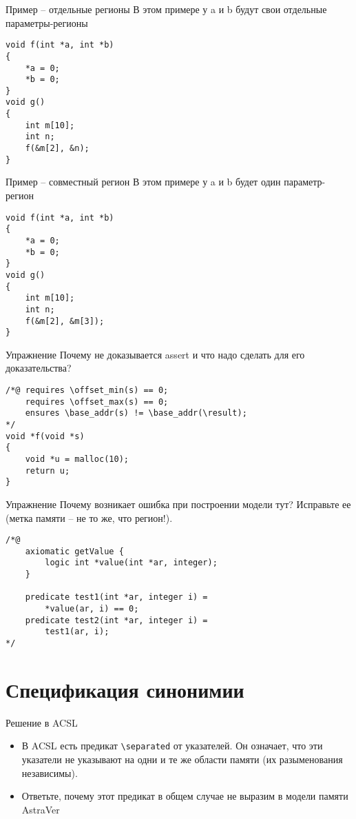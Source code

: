 \documentclass[hyperref={unicode=true}]{beamer}
\begin{document}
    \begin{frame}[fragile]{Пример -- отдельные регионы}
    В этом примере у a и b будут свои отдельные параметры-регионы
    \begin{lstlisting}
void f(int *a, int *b)
{
    *a = 0;
    *b = 0;
}
void g()
{
    int m[10];
    int n;
    f(&m[2], &n);
}    \end{lstlisting}
    \end{frame}

    \begin{frame}[fragile]{Пример -- совместный регион}
    В этом примере у a и b будет один параметр-регион
    \begin{lstlisting}
void f(int *a, int *b)
{
    *a = 0;
    *b = 0;
}
void g()
{
    int m[10];
    int n;
    f(&m[2], &m[3]);
}    \end{lstlisting}
    \end{frame}

    \begin{frame}[fragile]{Упражнение}
    Почему не доказывается assert и что надо сделать
    для его доказательства?
    \begin{lstlisting}
/*@ requires \offset_min(s) == 0;
    requires \offset_max(s) == 0;
    ensures \base_addr(s) != \base_addr(\result);
*/
void *f(void *s)
{
    void *u = malloc(10);
    return u;
}
    \end{lstlisting}
    \end{frame}

    \begin{frame}[fragile]{Упражнение}
    Почему возникает ошибка при построении модели тут?
    Исправьте ее (метка памяти -- не то же, что регион!).
    \begin{lstlisting}
/*@
    axiomatic getValue {
        logic int *value(int *ar, integer);
    }

    predicate test1(int *ar, integer i) =
        *value(ar, i) == 0;
    predicate test2(int *ar, integer i) =
        test1(ar, i);
*/
    \end{lstlisting}
    \end{frame}

    \section{Спецификация синонимии}

    \begin{frame}{Решение в ACSL}
    \begin{itemize}
    \item
    В ACSL есть предикат \texttt{\textbackslash{}separated}
    от указателей. Он означает, что эти указатели не указывают
    на одни и те же области памяти (их разыменования
    независимы).
    \item
    Ответьте, почему этот предикат в общем случае не
    выразим в модели памяти AstraVer
    \end{itemize}
    \end{frame}
\end{document}
